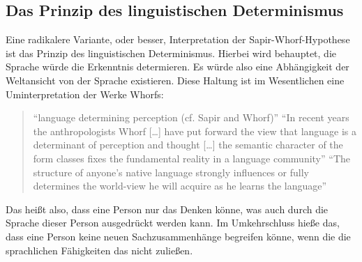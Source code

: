 \documentclass[12pt]{scrreprt}
\begin{document}
		\subsection{Das Prinzip des linguistischen Determinismus}
		\label{sec:sawo_lingdetermin}
		Eine radikalere Variante, oder besser, Interpretation der Sapir-Whorf-Hypothese
		ist das Prinzip des linguistischen Determinismus. Hierbei wird behauptet,
		die Sprache würde die Erkenntnis determieren. Es würde also eine
		Abhängigkeit der Weltansicht von der Sprache existieren. Diese Haltung ist
		im Wesentlichen eine Uminterpretation der Werke Whorfs:
		\blockquote{
			\enquote{language determining perception (cf. Sapir and Whorf)}\autocite[610--646]{article:LingSignific}\medskip\newline
			\enquote{In recent years the anthropologists Whorf […] have put forward the
			view that language is a determinant of perception and thought […] the
			semantic character of the form classes fixes the fundamental reality in a
			language community}\autocite[1--5]{article:LingDeterm}\medskip\newline
			\enquote{The structure of anyone’s native language strongly influences or
			fully determines the world-view he will acquire as he learns the language}\autocite[125--153]{article:Reference}
		}
		Das heißt also, dass eine Person nur das Denken könne, was auch durch die
		Sprache dieser Person ausgedrückt werden kann. Im Umkehrschluss hieße das,
		dass eine Person keine neuen Sachzusammenhänge begreifen könne, wenn die
		die sprachlichen Fähigkeiten das nicht zuließen.\autocite{article:Linguistic_Relativity}
\end{document}
